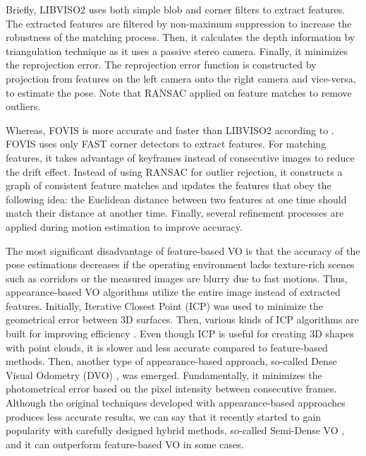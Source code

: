 \documentclass[a4paper]{report}
\numberwithin{figure}{section}
\begin{document}
Briefly, LIBVISO2 uses both 
simple blob and corner filters to extract features. The extracted features are 
filtered by non-maximum suppression to increase the robustness of the matching 
process. Then, it calculates the depth information by triangulation technique 
as it uses a passive stereo camera. Finally, it minimizes the reprojection 
error. The reprojection error function is constructed by projection from 
features on the left camera onto the right camera and vice-versa, to estimate 
the pose. Note that RANSAC applied on feature matches to remove outliers. 

Whereas, FOVIS is more accurate and faster than LIBVISO2 according to 
\parencite{Fang2015a}.
FOVIS uses only FAST corner detectors to extract features. For matching 
features, it takes advantage of keyframes instead of consecutive images to 
reduce the drift effect. Instead of using RANSAC for outlier rejection, it 
constructs 
a graph of consistent feature matches and updates the features that obey the 
following idea: the Euclidean distance between two features at one time should 
match 
their distance at another time. Finally, several refinement processes are 
applied during motion estimation to improve accuracy.

The most significant disadvantage of feature-based VO is that the accuracy of 
the pose estimations decreases if the operating environment lacks texture-rich 
scenes such as corridors or the measured images are blurry due to fast 
motions. Thus, appearance-based VO algorithms utilize the entire image instead 
of extracted features. Initially, Iterative Closest Point (ICP) 
\parencite{Besl1992} was used to minimize the geometrical error between 3D 
surfaces. Then, various kinds of ICP algorithms are built for improving 
efficiency \parencite{Rusinkiewicz2001}. Even though ICP is useful for 
creating 
3D 
shapes with point clouds, it is slower and less accurate compared to 
feature-based methods.
Then, another type of appearance-based approach, so-called Dense Visual 
Odometry (DVO) \parencite{Kerl2013a}, was emerged. Fundamentally, it minimizes 
the 
photometrical 
error based on the pixel intensity between consecutive frames. Although the 
original techniques developed with appearance-based approaches produces less 
accurate results, we can say that it recently started to gain popularity with 
carefully designed hybrid methods, so-called Semi-Dense VO 
\parencite{Zhou2017a}, 
and it can outperform feature-based VO in some cases.
\end{document}
